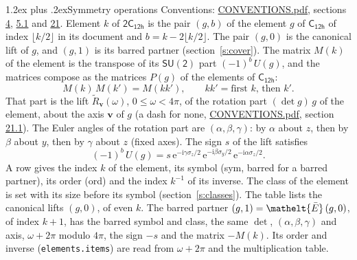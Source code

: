 \documentclass[10pt,a4paper]{article}
\makeatletter
\renewcommand\section{\@startsection{section}{1}{\z@}{-3ex plus -1ex minus -.2ex}%
  {1.2ex plus .2ex}{\normalfont\large\sffamily\bfseries\color{parttitle}}}
\numberwithin{equation}{section}
\newcommand{\eltfont}[1]{{\let\sigma\eltsigma\mathelt{#1}}}
\newcommand{\grp}[1]{\mathsf{#1}}
\newcommand{\elt}[1]{\eltfont{#1}}
\newcommand{\vv}{\mathbf{v}}
\newcommand{\iunit}{\mathrm{i}}
\newcommand{\expe}{\mathrm{e}}
\newcommand{\barred}[1]{\bar{#1}}
\newcommand{\lift}[1]{\tilde{#1}}
\newcommand{\pauli}[1]{\sigma_{#1}}
\makeatother
\begin{document}
\section{Symmetry operations}\label{s:elements}
Conventions: \href{../../CONVENTIONS.pdf}{CONVENTIONS.pdf}, sections \href{../../../rotation/CONVENTIONS.pdf\#conv.4}{4}, \href{../../../rotation/CONVENTIONS.pdf\#conv.5.1}{5.1} and \href{../../CONVENTIONS.pdf\#conv.21}{21}.
\leavevmode\label{n:index.element}\label{n:element.g}Element $k$ of $\grp{2C_{12h}}$ is the pair $(g, b)$ of the element $g$ of \href{../../../rotation/data/pdf/C12h.pdf}{$\grp{C_{12h}}$} of index $\lfloor k/2\rfloor$ in its document and $b = k - 2\lfloor k/2\rfloor$. The pair $(g, 0)$ is the canonical lift of $g$, and $(g, 1)$ is its barred partner (section~\ref{s:cover}). \label{n:matrix.element.pin}\label{n:matrix.element}The matrix $M(k)$ of the element is the transpose of its $\grp{SU(2)}$ part $(-1)^{b}\,U(g)$, and the matrices compose as the matrices $P(g)$ of the elements of $\grp{C_{12h}}$:
\begin{equation}\label{e:mprod}M(k)\,M(k') = M(kk'),\qquad kk' = \text{first } k\text{, then } k'.\end{equation}
\leavevmode\label{n:angle.omega}\label{n:vector.axis}\label{n:vector.pole}That part is the lift $\lift{R}_{\vv}(\omega)$, $0 \le \omega < 4\pi$, of the rotation part $(\det g)\,g$ of the element, about the axis $\vv$ of $g$ (a dash for none, \href{../../CONVENTIONS.pdf}{CONVENTIONS.pdf}, section \href{../../CONVENTIONS.pdf\#conv.21.1}{21.1}). \label{n:angle.euler.alpha}\label{n:angle.euler.beta}\label{n:angle.euler.gamma}\label{n:vector.coordinates}The Euler angles of the rotation part are $(\alpha,\beta,\gamma)$: by $\alpha$ about $z$, then by $\beta$ about $y$, then by $\gamma$ about $z$ (fixed axes). \label{n:local.euler.sign}The sign $s$ of the lift satisfies
\begin{equation}\label{e:euler}(-1)^{b}\,U(g) = s\,\expe^{-\iunit\gamma\pauli{z}/2}\,\expe^{-\iunit\beta\pauli{y}/2}\,\expe^{-\iunit\alpha\pauli{z}/2}.\end{equation}
\leavevmode\label{n:index.element.inverse}\label{n:head.sym}\label{n:head.ord}A row gives the index $k$ of the element, its symbol (sym, barred for a barred partner), its order (ord) and the index $k^{-1}$ of its inverse. \label{n:head.class}The class of the element is set with its size before its symbol (section~\ref{s:classes}).
The table lists the canonical lifts $(g, 0)$, of even $k$. The barred partner $(g, 1) = \elt{\barred{E}}\,(g, 0)$, of index $k + 1$, has the barred symbol and class, the same $\det$, $(\alpha,\beta,\gamma)$ and axis, $\omega + 2\pi$ modulo $4\pi$, the sign $-s$ and the matrix $-M(k)$. Its order and inverse (\texttt{elements.items}) are read from $\omega + 2\pi$ and the multiplication table.
\end{document}
